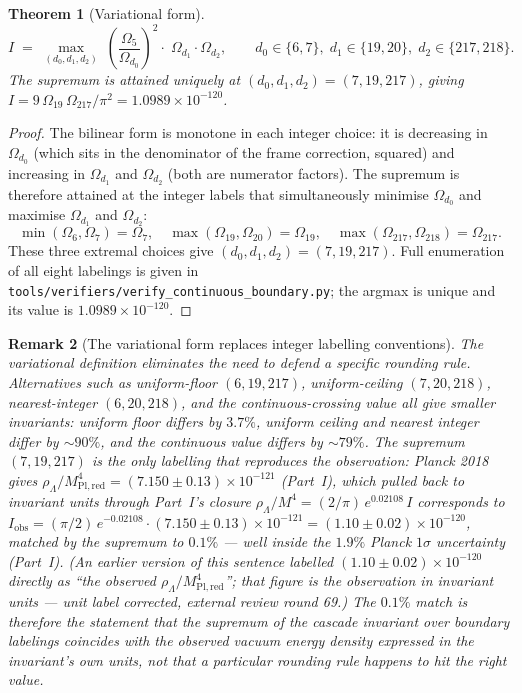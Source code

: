 \documentclass[11pt,a4paper]{article}
\newtheorem{theorem}{Theorem}[section]
\newtheorem{remark}[theorem]{Remark}
\begin{document}
\begin{theorem}[Variational form]\label{thm:variational}
\[
I \;=\; \max_{(d_0,d_1,d_2)}\;
\left(\frac{\Omega_5}{\Omega_{d_0}}\right)^{\!2}
\cdot\;\Omega_{d_1}\cdot\Omega_{d_2},
\qquad
d_0\in\{6,7\},\;
d_1\in\{19,20\},\;
d_2\in\{217,218\}.
\]
The supremum is attained uniquely at $(d_0,d_1,d_2) = (7,19,217)$,
giving $I = 9\,\Omega_{19}\,\Omega_{217}/\pi^2
= 1.0989\times 10^{-120}$.
\end{theorem}

\begin{proof}
The bilinear form is monotone in each integer choice: it is decreasing
in $\Omega_{d_0}$ (which sits in the denominator of the frame correction,
squared) and increasing in $\Omega_{d_1}$ and $\Omega_{d_2}$ (both are
numerator factors). The supremum is therefore attained at the integer
labels that simultaneously minimise $\Omega_{d_0}$ and maximise
$\Omega_{d_1}$ and $\Omega_{d_2}$:
\[
\min(\Omega_6,\Omega_7) = \Omega_7,\quad
\max(\Omega_{19},\Omega_{20}) = \Omega_{19},\quad
\max(\Omega_{217},\Omega_{218}) = \Omega_{217}.
\]
These three extremal choices give $(d_0,d_1,d_2) = (7,19,217)$. Full
enumeration of all eight labelings is given in
\texttt{tools/verifiers/verify\_continuous\_boundary.py}; the argmax is unique
and its value is $1.0989\times 10^{-120}$.
\end{proof}

\begin{remark}[The variational form replaces integer labelling conventions]
\label{rem:variational}
The variational definition eliminates the need to defend a specific
rounding rule. Alternatives such as uniform-floor $(6,19,217)$,
uniform-ceiling $(7,20,218)$, nearest-integer $(6,20,218)$, and the
continuous-crossing value all give smaller invariants: uniform floor
differs by $3.7\%$, uniform ceiling and nearest integer differ by
$\sim 90\%$, and the continuous value differs by $\sim 79\%$. The
supremum $(7,19,217)$ is the only labelling that reproduces the
observation: Planck 2018 gives $\rho_\Lambda/M_{\mathrm{Pl,red}}^4 =
(7.150\pm 0.13)\times 10^{-121}$ (Part~I), which pulled back to
invariant units through Part~I's closure
$\rho_\Lambda/M^4 = (2/\pi)\,e^{0.02108}\,I$ corresponds to
$I_{\mathrm{obs}} = (\pi/2)\,e^{-0.02108}\cdot(7.150\pm 0.13)\times
10^{-121} = (1.10\pm 0.02)\times 10^{-120}$, matched by the supremum
to $0.1\%$ --- well inside the $1.9\%$ Planck $1\sigma$ uncertainty
(Part~I). (An earlier version of this
sentence labelled $(1.10\pm 0.02)\times 10^{-120}$ directly as ``the
observed $\rho_\Lambda/M_{\mathrm{Pl,red}}^4$''; that figure is the
observation in invariant units --- unit label corrected, external
review round 69.) The $0.1\%$ match is therefore the statement that
the supremum of the cascade invariant over boundary labelings
coincides with the observed vacuum energy density expressed in the
invariant's own units, not that a particular
rounding rule happens to hit the right value.
\end{remark}
\end{document}
